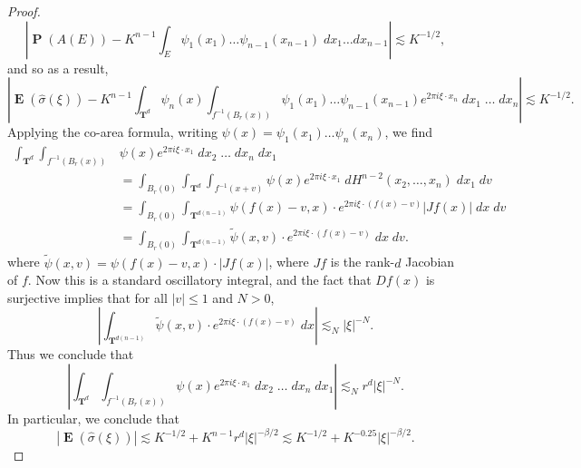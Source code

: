 \documentclass[12pt,reqno]{article}
\numberwithin{equation}{section}
\DeclareMathOperator{\TT}{\mathbf{T}}
\numberwithin{theorem}{section}
\DeclareMathOperator{\EE}{\mathbf{E}}
\DeclareMathOperator{\PP}{\mathbf{P}}
\begin{document}
\begin{proof}
\begin{equation}
        \left| \PP(A(E)) - K^{n-1} \int_E \psi_1(x_1) \dots \psi_{n-1}(x_{n-1})\; dx_1 \dots dx_{n-1} \right| \lesssim K^{-1/2},
    \end{equation}
    and so as a result,
    \begin{equation}
        \left| \EE(\widehat{\sigma}(\xi)) - K^{n-1} \int_{\TT^d} \psi_n(x) \int_{f^{-1}(B_r(x))} \psi_1(x_1) \dots \psi_{n-1}(x_{n-1}) e^{2 \pi i \xi \cdot x_n}\; dx_1\; \dots\; dx_n \right| \lesssim K^{-1/2}.
    \end{equation}
    Applying the co-area formula, writing $\psi(x) = \psi_1(x_1) \dots \psi_n(x_n)$, we find
    \begin{equation}
    \begin{split}
        \int_{\TT^d} \int_{f^{-1}(B_r(x))} &\psi(x) e^{2 \pi i \xi \cdot x_1}\; dx_2\; \dots\; dx_n\; dx_1\\
        &= \int_{B_r(0)} \int_{\TT^d} \int_{f^{-1}(x + v)} \psi(x) e^{2 \pi i \xi \cdot x_1}\; dH^{n-2}(x_2,\dots,x_n)\; dx_1\; dv\\
        &= \int_{B_r(0)} \int_{\TT^{d(n-1)}} \psi(f(x) - v,x) \cdot e^{2 \pi i \xi \cdot (f(x) - v)} |Jf(x)|\; dx\; dv\\
        &= \int_{B_r(0)} \int_{\TT^{d(n-1)}} \tilde{\psi}(x,v) \cdot e^{2 \pi i \xi \cdot (f(x) - v)}\; dx\; dv.
    \end{split}
    \end{equation}
    where $\tilde{\psi}(x,v) = \psi(f(x) - v, x) \cdot |Jf(x)|$, where $Jf$ is the rank-$d$ Jacobian of $f$. Now this is a standard oscillatory integral, and the fact that $Df(x)$ is surjective implies that for all $|v| \leq 1$ and $N > 0$,
    \begin{equation}
        \left|\int_{\TT^{d(n-1)}} \tilde{\psi}(x,v) \cdot e^{2 \pi i \xi \cdot (f(x) - v)}\; dx \right| \lesssim_N |\xi|^{-N}.
    \end{equation}
    Thus we conclude that
    \begin{equation}
        \left| \int_{\TT^d} \int_{f^{-1}(B_r(x))} \psi(x) e^{2 \pi i \xi \cdot x_1}\; dx_2\; \dots\; dx_n\; dx_1 \right| \lesssim_N r^d |\xi|^{-N}.
    \end{equation}
    In particular, we conclude that
    \begin{equation}
        |\EE(\widehat{\sigma}(\xi)) | \lesssim K^{-1/2} + K^{n-1} r^d |\xi|^{-\beta/2} \lesssim K^{-1/2} + K^{-0.25} |\xi|^{-\beta/2}.
    \end{equation}

\end{proof}
\end{document}
